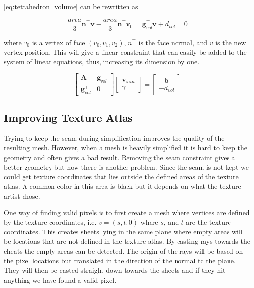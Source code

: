 \cref{eq:tetrahedron_volume} can be rewritten as 

\begin{equation} \label{eq:tetrahedron_volume_rewritten}
\frac{area}{3} \mathbf{n}^\intercal \mathbf{v} - \frac{area}{3} \mathbf{n}^\intercal \mathbf{v}_0 = \mathbf{g}_{vol}^\intercal \mathbf{v} + d_{vol} = 0
\end{equation}


where $v_0$ is a vertex of face $(v_0, v_1, v_2)$, $n^\intercal$ is the face normal, and $v$ is the new vertex position. This will give a linear constraint that can easily be added to the system of linear equations, thus, increasing its dimension by one.

\begin{equation} \label{eq:volume_constraint}
  \begin{bmatrix}
    \mathbf{A}                & \mathbf{g}_{vol} \\
     \mathbf{g}_{vol}^\intercal & 0
  \end{bmatrix}
  \begin{bmatrix}
    \mathbf{v}_{min} \\
    \gamma
  \end{bmatrix}
  =
  \begin{bmatrix}
    -\mathbf{b} \\
    -d_{vol}
  \end{bmatrix}
\end{equation}


\subsection{Improving Texture Atlas}
Trying to keep the seam during simplification improves the quality of the resulting mesh. However, when a mesh is heavily simplified it is hard to keep the geometry and often gives a bad result. Removing the seam constraint gives a better geometry but now there is another problem. Since the seam is not kept we could get texture coordinates that lies outside the defined areas of the texture atlas. A common color in this area is black but it depends on what the texture artist chose.

One way of finding valid pixels is to first create a mesh where vertices are defined by the texture coordinates, i.e. $v = (s, t, 0)$ where $s$, and $t$ are the texture coordinates. This creates sheets lying in the same plane where empty areas will be locations that are not defined in the texture atlas. By casting rays towards the cheats the empty areas can be detected. The origin of the rays will be based on the pixel locations but translated in the direction of the normal to the plane. They will then be casted straight down towards the sheets and if they hit anything we have found a valid pixel.

